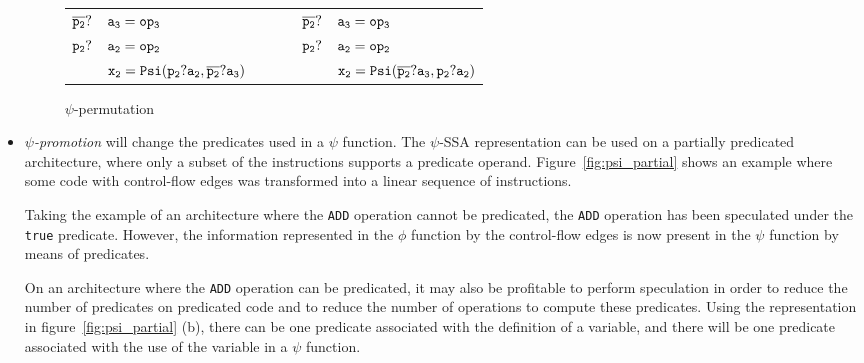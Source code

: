 \begin{itemize}
\begin{figure}
\begin{center}
\footnotesize
\begin{tabular}{lllll}
${\tt \overline{p_2}?}$ & ${\tt a_3 = op_3}$              & \ \ \ \  & ${\tt \overline{p_2}?}$ & ${\tt a_3 = op_3}$ \\
${\tt p_2?}$ & ${\tt a_2 = op_2}$             & \ \ \ \  & ${\tt p_2?}$ & ${\tt a_2 = op_2}$ \\
             & ${\tt x_2 = Psi(p_2?a_2, \overline{p_2}?a_3)}$ & \ \ \ \  &              &${\tt x_2 = Psi(\overline{p_2}?a_3, p_2?a_2)}$ \\
\end{tabular}
\caption{$\psi$-permutation}
\label{fig:psi_permutation}
\end{center}
\end{figure}


\item{\emph{$\psi$-promotion}} will change the predicates used in a
  $\psi$ function. The $\psi$-SSA representation can be used on a
  partially predicated architecture, where only a subset of the
  instructions supports a predicate operand.
  Figure~\ref{fig:psi_partial} shows an example where some code with
  control-flow edges was transformed into a linear sequence of
  instructions.

Taking the example of an architecture where the {\tt ADD} operation
cannot be predicated, the {\tt ADD} operation has been speculated
under the {\tt true} predicate. However, the information represented
in the $\phi$ function by the control-flow edges is now present in the
$\psi$ function by means of predicates.

On an architecture where the {\tt ADD} operation can be predicated, it
may also be profitable to perform speculation in order to reduce the
number of predicates on predicated code and to reduce the number of
operations to compute these predicates. Using the representation in
figure~\ref{fig:psi_partial} (b), there can be one predicate associated
with the definition of a variable, and there will be one predicate
associated with the use of the variable in a $\psi$ function.


\end{itemize}
